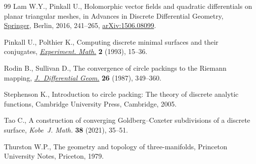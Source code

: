 \documentclass[10pt,a4paper]{amsart}
\newcommand{\1}{{\bf 1}}
\numberwithin{equation}{section}
\begin{document}
\begin{thebibliography}{99}
Lam W.Y., Pinkall U., Holomorphic vector fields and quadratic differentials on
  planar triangular meshes, in Advances in {D}iscrete {D}ifferential
  {G}eometry,  \href{https://doi.org/10.1007/978-3-662-50447-5_7}{Springer}, Berlin, 2016, 241--265, \href{https://arxiv.org/abs/1506.08099}{arXiv:1506.08099}.

Pinkall U., Polthier K., Computing discrete minimal surfaces and their
  conjugates,  \href{https://doi.org/10.1080/10586458.1993.10504266}{\textit{Experiment. Math.}} \textbf{2} (1993), 15--36.

Rodin B., Sullivan D., The convergence of circle packings to the {R}iemann
  mapping,  \href{https://doi.org/10.4310/jdg/1214441375}{\textit{J.~Differential Geom.}} \textbf{26} (1987), 349--360.

Stephenson K., Introduction to circle packing: {T}he theory of discrete
  analytic functions, Cambridge University Press, Cambridge, 2005.

Tao C., A construction of converging {G}oldberg--{C}oxeter subdivisions of a
  discrete surface, \textit{Kobe~J. Math.} \textbf{38} (2021), 35--51.

Thurston W.P., The geometry and topology of three-manifolds, Princeton
  University Notes, Priceton, 1979.

\end{thebibliography}
\end{document}
